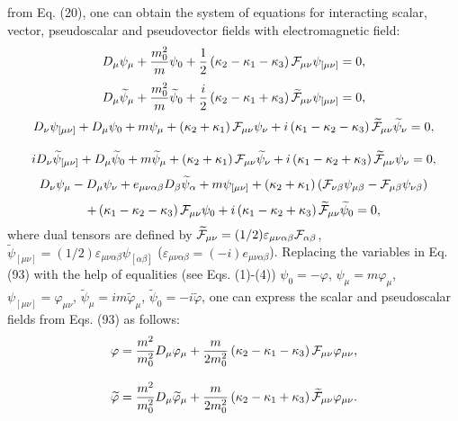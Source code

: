 \documentclass[a4paper,12pt]{article}
\begin{document}
from Eq. (20), one can obtain the system of equations for
interacting scalar, vector, pseudoscalar and pseudovector fields
with electromagnetic field:
\[
D_\mu \psi_\mu +\frac{m_0^2}{m}\psi_0 +\frac{1}{2}\left(\kappa_2
-\kappa_1 -\kappa_3\right){\cal F}_{\mu\nu}\psi_{[\mu\nu]}=0 ,
\]
\[
D_\mu \widetilde{\psi}_\mu+\frac{m_0^2}{m}\widetilde{\psi}_0
+\frac{i}{2}\left(\kappa_2 -\kappa_1 +\kappa_3\right)\widetilde{
{\cal F}}_{\mu\nu}\psi_{[\mu\nu]}=0 ,
\]
\[
D_\nu \psi_{[\mu\nu]} +D_{\mu}\psi_0 + m\psi_\mu  +
 \left(\kappa_2 +\kappa_1 \right){\cal
F}_{\mu\nu}\psi_{\nu}+i\left(\kappa_1 -\kappa_2
-\kappa_3\right)\widetilde{ {\cal
F}}_{\mu\nu}\widetilde{\psi}_{\nu}=0 ,
\]
\vspace{-7mm}
\begin{equation}  \label{93}
\end{equation}
\vspace{-7mm}
\[
iD_\nu \widetilde{\psi}_{[\mu\nu]} +D_{\mu}\widetilde{\psi}_0 +
m\widetilde{\psi}_\mu  +
 \left(\kappa_2 +\kappa_1 \right){\cal
F}_{\mu\nu}\widetilde{\psi}_{\nu}+i\left(\kappa_1 -\kappa_2
+\kappa_3\right)\widetilde{ {\cal F}}_{\mu\nu}\psi_{\nu}=0 ,
\]
\[
D_\nu \psi_{\mu} -D_{\mu}\psi_\nu + e_{\mu\nu\alpha\beta}D_\beta
\widetilde{\psi}_\alpha + m\psi_{[\mu \nu]} +
 \left(\kappa_2 +\kappa_1 \right)\left({\cal
F}_{\nu\beta}\psi_{\mu\beta}- {\cal
F}_{\mu\beta}\psi_{\nu\beta}\right)
\]
\[
+\left(\kappa_1 -\kappa_2 -\kappa_3\right)  {\cal F}_{\mu\nu}
\psi_0 +i\left(\kappa_1 -\kappa_2 +\kappa_3\right)\widetilde{
{\cal F}}_{\mu\nu}\widetilde{\psi}_0=0 ,
\]
where dual tensors are defined by $\widetilde{ {\cal
F}}_{\mu\nu}=(1/2)\varepsilon_{\mu\nu\alpha\beta}{\cal
F}_{\alpha\beta}$, $\widetilde{
\psi}_{[\mu\nu]}=(1/2)\varepsilon_{\mu\nu\alpha\beta}\psi_
{[\alpha\beta]}$ ($\varepsilon_{\mu\nu\alpha\beta}
=(-i)e_{\mu\nu\alpha\beta}$). Replacing the variables in Eq. (93)
with the help of equalities (see Eqs. (1)-(4)) $\psi _0 =-\varphi
$, $\psi _\mu =m\varphi _\mu $, $\psi _{[\mu \nu ]}=\varphi _{\mu
\nu }$, $\widetilde{\psi }_\mu =im\widetilde{ \varphi }_\mu $,
$\widetilde{\psi }_0 =-i\widetilde{\varphi }$, one can express the
scalar and pseudoscalar fields from Eqs. (93) as follows:
\[
\varphi =\frac{m^2}{m_0^2}D_\mu \varphi_\mu
+\frac{m}{2m_0^2}\left(\kappa_2 -\kappa_1 -\kappa_3\right){\cal
F}_{\mu\nu}\varphi_{\mu\nu} ,
\]
\vspace{-7mm}
\begin{equation}  \label{94}
\end{equation}
\vspace{-7mm}
\[
\widetilde{\varphi} =\frac{m^2}{m_0^2}D_\mu
\widetilde{\varphi}_\mu +\frac{m}{2m_0^2}\left(\kappa_2 -\kappa_1
+\kappa_3\right)\widetilde{{\cal F}}_{\mu\nu}\varphi_{\mu\nu} .
\]
\end{document}
